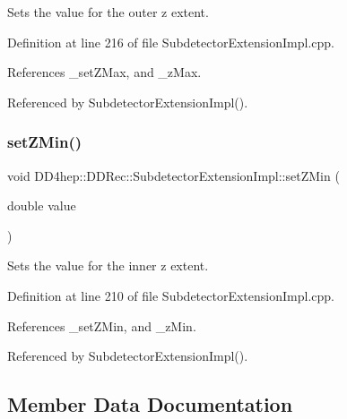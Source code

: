 Sets the value for the outer z extent. 



Definition at line 216 of file Subdetector\+Extension\+Impl.\+cpp.



References \+\_\+set\+Z\+Max, and \+\_\+z\+Max.



Referenced by Subdetector\+Extension\+Impl().

\hypertarget{class_d_d4hep_1_1_d_d_rec_1_1_subdetector_extension_impl_a36879a3796e4eeccdc1d2ec1050894a8}{}\label{class_d_d4hep_1_1_d_d_rec_1_1_subdetector_extension_impl_a36879a3796e4eeccdc1d2ec1050894a8} 
\subsubsection{\texorpdfstring{set\+Z\+Min()}{setZMin()}}
{\footnotesize\ttfamily void D\+D4hep\+::\+D\+D\+Rec\+::\+Subdetector\+Extension\+Impl\+::set\+Z\+Min (\begin{DoxyParamCaption}\item[{double}]{value }\end{DoxyParamCaption})}



Sets the value for the inner z extent. 



Definition at line 210 of file Subdetector\+Extension\+Impl.\+cpp.



References \+\_\+set\+Z\+Min, and \+\_\+z\+Min.



Referenced by Subdetector\+Extension\+Impl().



\subsection{Member Data Documentation}
\hypertarget{class_d_d4hep_1_1_d_d_rec_1_1_subdetector_extension_impl_aca8d64e7e01c75f25020bcb13b68ba76}{}\label{class_d_d4hep_1_1_d_d_rec_1_1_subdetector_extension_impl_aca8d64e7e01c75f25020bcb13b68ba76} 
